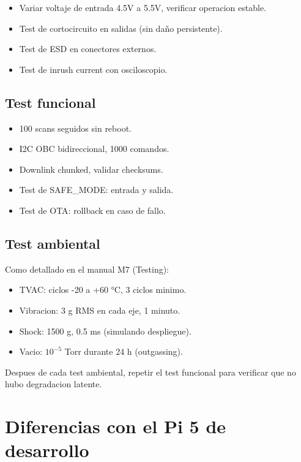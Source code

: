 \documentclass[11pt,a4paper,oneside,openright]{book}
\begin{document}
\begin{itemize}[leftmargin=2em]
  \item Variar voltaje de entrada 4.5V a 5.5V, verificar operacion estable.
  \item Test de cortocircuito en salidas (sin daño persistente).
  \item Test de ESD en conectores externos.
  \item Test de inrush current con osciloscopio.
\end{itemize}

\section{Test funcional}

\begin{itemize}[leftmargin=2em]
  \item 100 scans seguidos sin reboot.
  \item I2C OBC bidireccional, 1000 comandos.
  \item Downlink chunked, validar checksums.
  \item Test de SAFE\_MODE: entrada y salida.
  \item Test de OTA: rollback en caso de fallo.
\end{itemize}

\section{Test ambiental}

Como detallado en el manual M7 (Testing):
\begin{itemize}[leftmargin=2em]
  \item TVAC: ciclos -20 a +60 °C, 3 ciclos minimo.
  \item Vibracion: 3 g RMS en cada eje, 1 minuto.
  \item Shock: 1500 g, 0.5 ms (simulando despliegue).
  \item Vacio: $10^{-5}$ Torr durante 24 h (outgassing).
\end{itemize}

\begin{cuidado}
Despues de cada test ambiental, repetir el test funcional para verificar
que no hubo degradacion latente.
\end{cuidado}

\chapter{Diferencias con el Pi 5 de desarrollo}
\end{document}
